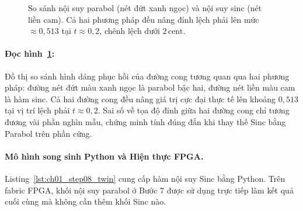\begin{figure}[H]
\centering
{}
\caption{So sánh nội suy parabol (nét đứt xanh ngọc) và nội suy sinc (nét liền cam). Cả hai phương pháp đều nâng đỉnh lệch phải lên mức $\approx 0{,}513$ tại $t \approx 0{,}2$, chênh lệch dưới $2\,\text{cent}$.}
\label{fig:ch01_sinc_vs_parabola}
\end{figure}

\paragraph{Đọc hình~\ref{fig:ch01_sinc_vs_parabola}:}
Đồ thị so sánh hình dáng phục hồi của đường cong tương quan qua hai phương pháp: đường nét đứt màu xanh ngọc là parabol bậc hai, đường nét liền màu cam là hàm sinc. Cả hai đường cong đều nâng giá trị cực đại thực tế lên khoảng $0{,}513$ tại vị trí lệch phải $t \approx 0{,}2$. Sai số về tọa độ đỉnh giữa hai đường cong chỉ tương đương vài phần nghìn mẫu, chứng minh tính đúng đắn khi thay thế Sinc bằng Parabol trên phần cứng.

\paragraph{Mô hình song sinh Python và Hiện thực FPGA.}
Listing~\ref{lst:ch01_step08_twin} cung cấp hàm nội suy Sinc bằng Python. Trên fabric FPGA, khối nội suy parabol ở Bước 7 được sử dụng trực tiếp làm kết quả cuối cùng mà không cần thêm khối Sinc nào.


